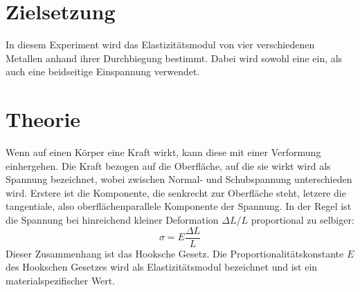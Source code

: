 \section{Zielsetzung}
In diesem Experiment wird das Elastizitätsmodul von vier verschiedenen Metallen anhand ihrer Durchbiegung bestimmt. Dabei wird sowohl eine ein, als auch 
eine beidseitige Einspannung verwendet.
\section{Theorie}
Wenn auf einen Körper eine Kraft wirkt, kann diese mit einer Verformung einhergehen. Die Kraft bezogen auf die Oberfläche, auf die sie wirkt wird als Spannung bezeichnet, wobei 
zwischen Normal- und Schubspannung unterschieden wird. Erstere ist die Komponente, die senkrecht zur Oberfläche steht, letzere die tangentiale, 
also oberflächenparallele Komponente der Spannung. In der Regel ist die Spannung bei hinreichend kleiner Deformation $\Delta L/L$ proportional zu selbiger:
\begin{equation}
\sigma=E\frac{\Delta L}{L}
\end{equation}
Dieser Zusammenhang ist das Hooksche Gesetz. Die Proportionalitätskonstante $E$ des Hookschen Gesetzes wird als Elastizitätsmodul bezeichnet und ist ein 
materialspezifischer Wert. \\
